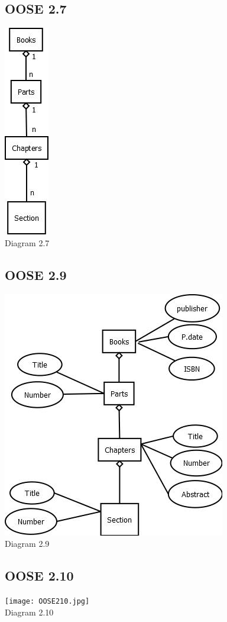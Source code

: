 \documentclass{article}
\begin{document}
\subsection{OOSE 2.7}
\includegraphics[scale=.5]{2_7.jpg} \\{\footnotesize Diagram 2.7}

\subsection{OOSE 2.9}
\includegraphics[scale=.5]{2_9.jpg} \\{\footnotesize Diagram 2.9}


\subsection{OOSE 2.10}
\texttt{[image: OOSE210.jpg]} \\{\footnotesize Diagram 2.10}
\end{document}
